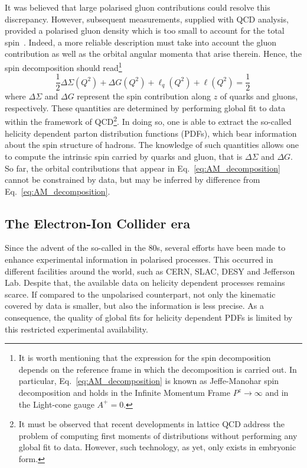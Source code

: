 It was believed that large polarised gluon contributions could resolve this discrepancy. However, subsequent measurements, supplied with QCD analysis, provided a polarised gluon density which is too small to account for the total spin~\cite{Leader:2005ci}. Indeed, a more reliable description must take into account the gluon contribution as well as the orbital angular momenta that arise therein. Hence, the spin decomposition should read\footnote{\footnotesize It is worth mentioning that the expression for the spin decomposition depends on the reference frame in which the decomposition is carried out. In particular, Eq.~\eqref{eq:AM_decomposition} is known as Jeffe-Manohar spin decomposition and holds in the Infinite Momentum Frame $P^z \rightarrow \infty$ and in the Light-cone gauge $A^+=0$.}
%
\begin{equation}
  \frac{1}{2} \Delta \Sigma(Q^2) + \Delta G(Q^2) + \ell_{q}(Q^2) + \ell(Q^2) = \frac{1}{2} \,
  \label{eq:AM_decomposition}
\end{equation}
%
where $\Delta \Sigma$ and $\Delta G$ represent the spin contribution along $z$ of quarks and gluons, respectively. These quantities are determined by performing global fit to data within the framework of QCD\footnote{\footnotesize It must be observed that recent developments in lattice QCD address the problem of computing first moments of distributions without performing any global fit to data. However, such technology, as yet, only exists in embryonic form.}. In doing so, one is able to extract the so-called helicity dependent parton distribution functions (PDFs), which bear information about the spin structure of hadrons. The knowledge of such quantities allows one to compute the intrinsic spin carried by quarks and gluon, that is $\Delta \Sigma$ and $\Delta G$. So far, the orbital contributions that appear in Eq.~\eqref{eq:AM_decomposition} cannot be constrained by data, but may be inferred by difference from Eq.~\eqref{eq:AM_decomposition}.

\subsection*{The Electron-Ion Collider era}

Since the advent of the so-called  in the 80s, several efforts have been made to enhance experimental information in polarised processes. This occurred in different facilities around the world, such as CERN, SLAC, DESY and Jefferson Lab. Despite that, the available data on helicity dependent processes remains scarce. If compared to the unpolarised counterpart, not only the kinematic covered by data is smaller, but also the information is less precise. As a consequence, the quality of global fits for helicity dependent PDFs is limited by this restricted experimental availability. 

